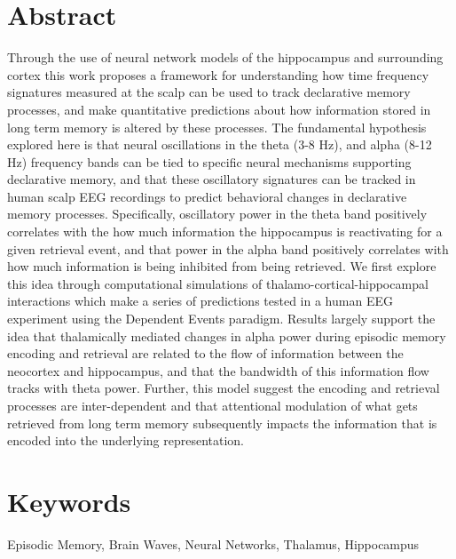 \documentclass[11pt, titlepage, twoside]{article}
\begin{document}
\section*{Abstract}\label{sec:abstract}
Through the use of neural network models of the hippocampus and surrounding cortex this work proposes a framework for understanding how time frequency signatures measured at the scalp can be used to track declarative memory processes, and make quantitative predictions about how information stored in long term memory is altered by these processes.  The fundamental hypothesis explored here is that neural oscillations in the theta (3-8 Hz), and alpha (8-12 Hz) frequency bands can be tied to specific neural mechanisms supporting declarative memory, and that these oscillatory signatures can be tracked in human scalp EEG recordings to predict behavioral changes in declarative memory processes. Specifically, oscillatory power in the theta band positively correlates with the how much information the hippocampus is reactivating for a given retrieval event, and that power in the alpha band positively correlates with how much information is being inhibited from being retrieved.  We first explore this idea through computational simulations of thalamo-cortical-hippocampal interactions which make a series of predictions tested in a human EEG experiment using the Dependent Events paradigm.  Results largely support the idea that thalamically mediated changes in alpha power during episodic memory encoding and retrieval are related to the flow of information between the neocortex and hippocampus, and that the bandwidth of this information flow tracks with theta power.  Further, this model suggest the encoding and retrieval processes are inter-dependent and that attentional modulation of what gets retrieved from long term memory subsequently impacts the information that is encoded into the underlying representation.

\section*{Keywords}
Episodic Memory, Brain Waves, Neural Networks, Thalamus, Hippocampus
\end{document}

